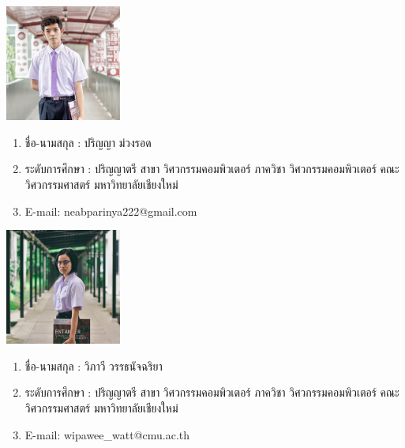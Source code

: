 \documentclass[final]{cpecmu}
\author{นายปริญญา ม่วงรอด}{Parinya Muangrod}{630612104}
\author{นางสาววิภาวี วรรธนัจฉริยา}{Wipawee Wattanutchariya}{630612190}
\begin{document}


\pagestyle{empty}\cleardoublepage
\normalspacing \setcounter{page}{1}  \pagestyle{cpecmu}





\ifproject
  
\fi



\ifproject
  \normalspacing
  \appendix
  

  \ifglossary\glossarypage\fi

  \ifindex\indexpage\fi

  \begin{biosketch}
    \begin{center}
      \includegraphics[width=1.5in]{Images/Profile Parinya.jpg}
    \end{center}
    \begin{enumerate}
      \item[] ชื่อ-นามสกุล : ปริญญา ม่วงรอด
      \item[] ระดับการศึกษา : ปริญญาตรี สาขา วิศวกรรมคอมพิวเตอร์ ภาควิชา วิศวกรรมคอมพิวเตอร์ คณะ วิศวกรรมศาสตร์ มหาวิทยาลัยเชียงใหม่
      \item[] E-mail: neabparinya222@gmail.com
    \end{enumerate}

    \begin{center}
      \includegraphics[width=1.5in]{Images/Profile Wipawee.jpg}
    \end{center}
    \begin{enumerate}
      \item[] ชื่อ-นามสกุล : วิภาวี วรรธนัจฉริยา
      \item[] ระดับการศึกษา : ปริญญาตรี สาขา วิศวกรรมคอมพิวเตอร์ ภาควิชา วิศวกรรมคอมพิวเตอร์ คณะ วิศวกรรมศาสตร์ มหาวิทยาลัยเชียงใหม่
      \item[] E-mail: wipawee\_watt@cmu.ac.th
    \end{enumerate}
  \end{biosketch}
\fi %
\end{document}
